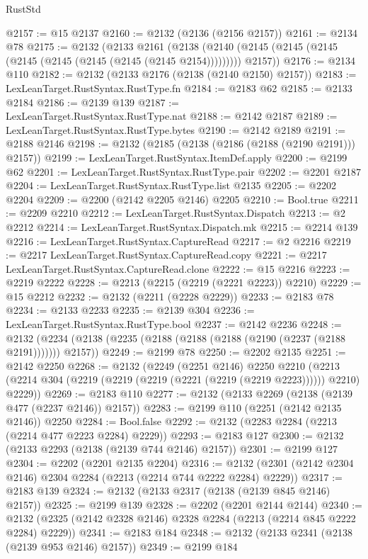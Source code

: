 \begin{lexlean}{RustStd}
\begin{coremodule}
@2157 := @15 @2137
@2160 := @2132 (@2136 (@2156 @2157))
@2161 := @2134 @78
@2175 := @2132
    (@2133
      @2161
      (@2138 (@2140 (@2145 (@2145 (@2145 (@2145 (@2145 (@2145 (@2145 (@2145 @2154))))))))) @2157))
@2176 := @2134 @110
@2182 := @2132 (@2133 @2176 (@2138 (@2140 @2150) @2157))
@2183 := LexLeanTarget.RustSyntax.RustType.fn
@2184 := @2183 @62
@2185 := @2133 @2184
@2186 := @2139 @139
@2187 := LexLeanTarget.RustSyntax.RustType.nat
@2188 := @2142 @2187
@2189 := LexLeanTarget.RustSyntax.RustType.bytes
@2190 := @2142 @2189
@2191 := @2188 @2146
@2198 := @2132 (@2185 (@2138 (@2186 (@2188 (@2190 @2191))) @2157))
@2199 := LexLeanTarget.RustSyntax.ItemDef.apply
@2200 := @2199 @62
@2201 := LexLeanTarget.RustSyntax.RustType.pair
@2202 := @2201 @2187
@2204 := LexLeanTarget.RustSyntax.RustType.list @2135
@2205 := @2202 @2204
@2209 := @2200 (@2142 @2205 @2146) @2205
@2210 := Bool.true
@2211 := @2209 @2210
@2212 := LexLeanTarget.RustSyntax.Dispatch
@2213 := @2 @2212
@2214 := LexLeanTarget.RustSyntax.Dispatch.mk
@2215 := @2214 @139
@2216 := LexLeanTarget.RustSyntax.CaptureRead
@2217 := @2 @2216
@2219 := @2217 LexLeanTarget.RustSyntax.CaptureRead.copy
@2221 := @2217 LexLeanTarget.RustSyntax.CaptureRead.clone
@2222 := @15 @2216
@2223 := @2219 @2222
@2228 := @2213 (@2215 (@2219 (@2221 @2223)) @2210)
@2229 := @15 @2212
@2232 := @2132 (@2211 (@2228 @2229))
@2233 := @2183 @78
@2234 := @2133 @2233
@2235 := @2139 @304
@2236 := LexLeanTarget.RustSyntax.RustType.bool
@2237 := @2142 @2236
@2248 := @2132 (@2234 (@2138 (@2235 (@2188 (@2188 (@2188 (@2190 (@2237 (@2188 @2191))))))) @2157))
@2249 := @2199 @78
@2250 := @2202 @2135
@2251 := @2142 @2250
@2268 := @2132
    (@2249
      (@2251 @2146)
      @2250
      @2210
      (@2213 (@2214 @304 (@2219 (@2219 (@2219 (@2221 (@2219 (@2219 @2223)))))) @2210) @2229))
@2269 := @2183 @110
@2277 := @2132 (@2133 @2269 (@2138 (@2139 @477 (@2237 @2146)) @2157))
@2283 := @2199 @110 (@2251 (@2142 @2135 @2146)) @2250
@2284 := Bool.false
@2292 := @2132 (@2283 @2284 (@2213 (@2214 @477 @2223 @2284) @2229))
@2293 := @2183 @127
@2300 := @2132 (@2133 @2293 (@2138 (@2139 @744 @2146) @2157))
@2301 := @2199 @127
@2304 := @2202 (@2201 @2135 @2204)
@2316 := @2132 (@2301 (@2142 @2304 @2146) @2304 @2284 (@2213 (@2214 @744 @2222 @2284) @2229))
@2317 := @2183 @139
@2324 := @2132 (@2133 @2317 (@2138 (@2139 @845 @2146) @2157))
@2325 := @2199 @139
@2328 := @2202 (@2201 @2144 @2144)
@2340 := @2132 (@2325 (@2142 @2328 @2146) @2328 @2284 (@2213 (@2214 @845 @2222 @2284) @2229))
@2341 := @2183 @184
@2348 := @2132 (@2133 @2341 (@2138 (@2139 @953 @2146) @2157))
@2349 := @2199 @184

\end{coremodule}
\end{lexlean}
